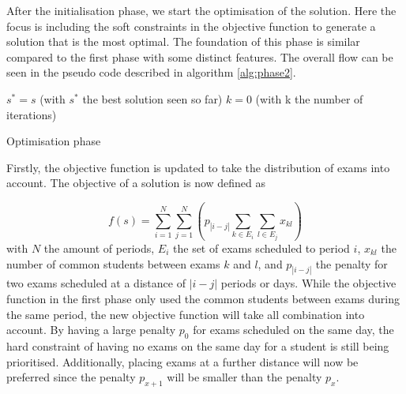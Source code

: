 After the initialisation phase, we start the optimisation of the solution. Here the focus is including the soft constraints in the objective function to generate a solution that is the most optimal. The foundation of this phase is similar compared to the first phase with some distinct features. The overall flow can be seen in the pseudo code described in algorithm \ref{alg:phase2}.

\begin{algorithm}
 $s^* = s$ (with $s^*$ the best solution seen so far)\;
 $k = 0$ (with k the number of iterations)\;

\caption{Optimisation phase}
\label{alg:phase2}
\end{algorithm}


Firstly, the objective function is updated to take the distribution of exams into account. The objective of a solution is now defined as

\begin{equation}
    f(s) = \sum_{i=1}^{N} \sum_{j=1}^{N}(p_{|i-j|} \sum_{k \in E_i}^{}\sum_{l \in E_j}^{} x_{kl})
\end{equation}
with $N$ the amount of periods, $E_i$ the set of exams scheduled to period $i$, $x_{kl}$ the number of common students between exams $k$ and $l$, and $p_{|i-j|}$ the penalty for two exams scheduled at a distance of $|i-j|$ periods or days. While the objective function in the first phase only used the common students between exams during the same period, the new objective function will take all combination into account. By having a large penalty $p_0$ for exams scheduled on the same day, the hard constraint of having no exams on the same day for a student is still being prioritised. Additionally, placing exams at a further distance will now be preferred since the penalty $p_{x+1}$ will be smaller than the penalty $p_x$.

